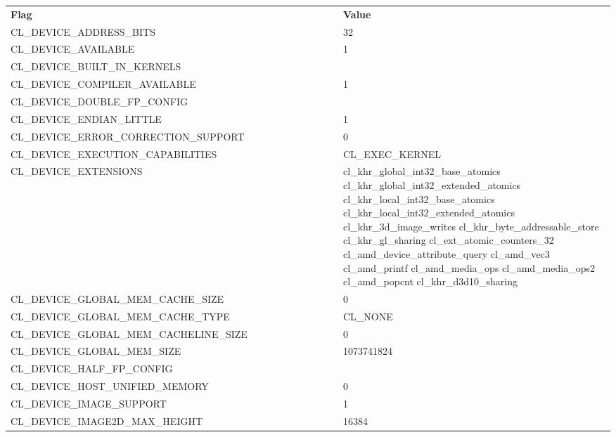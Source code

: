 \begin{longtable}{p{0.55\linewidth} p{0.45\linewidth}}
\textbf{Flag} & \textbf{Value} \\
CL\_DEVICE\_ADDRESS\_BITS & 32 \\
CL\_DEVICE\_AVAILABLE & 1 \\
CL\_DEVICE\_BUILT\_IN\_KERNELS &  \\
CL\_DEVICE\_COMPILER\_AVAILABLE & 1 \\
CL\_DEVICE\_DOUBLE\_FP\_CONFIG &  \\
CL\_DEVICE\_ENDIAN\_LITTLE & 1 \\
CL\_DEVICE\_ERROR\_CORRECTION\_SUPPORT & 0 \\
CL\_DEVICE\_EXECUTION\_CAPABILITIES & CL\_EXEC\_KERNEL  \\
CL\_DEVICE\_EXTENSIONS & cl\_khr\_global\_int32\_base\_atomics \newline cl\_khr\_global\_int32\_extended\_atomics \newline cl\_khr\_local\_int32\_base\_atomics \newline cl\_khr\_local\_int32\_extended\_atomics \newline cl\_khr\_3d\_image\_writes \newline cl\_khr\_byte\_addressable\_store \newline cl\_khr\_gl\_sharing \newline cl\_ext\_atomic\_counters\_32 \newline cl\_amd\_device\_attribute\_query \newline cl\_amd\_vec3 \newline cl\_amd\_printf \newline cl\_amd\_media\_ops \newline cl\_amd\_media\_ops2 \newline cl\_amd\_popcnt \newline cl\_khr\_d3d10\_sharing \\
CL\_DEVICE\_GLOBAL\_MEM\_CACHE\_SIZE & 0 \\
CL\_DEVICE\_GLOBAL\_MEM\_CACHE\_TYPE & CL\_NONE \\
CL\_DEVICE\_GLOBAL\_MEM\_CACHELINE\_SIZE & 0 \\
CL\_DEVICE\_GLOBAL\_MEM\_SIZE & 1073741824 \\
CL\_DEVICE\_HALF\_FP\_CONFIG &  \\
CL\_DEVICE\_HOST\_UNIFIED\_MEMORY & 0 \\
CL\_DEVICE\_IMAGE\_SUPPORT & 1 \\
CL\_DEVICE\_IMAGE2D\_MAX\_HEIGHT & 16384 \\

\end{longtable}
